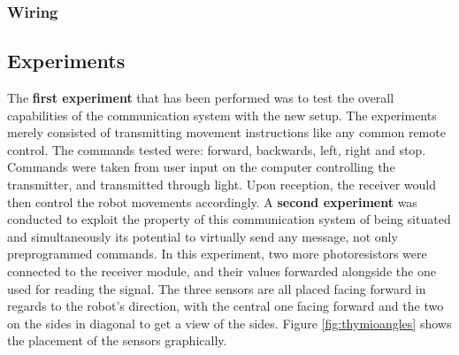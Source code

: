 \subsubsection{Wiring}

\subsection{Experiments}
The \textbf{first experiment} that has been performed was to test the overall capabilities of the communication system with the new setup.
The experiments merely consisted of transmitting movement instructions like any common remote control.
The commands tested were: forward, backwards, left, right and stop.
Commands were taken from user input on the computer controlling the transmitter, and transmitted through light.
Upon reception, the receiver would then control the robot movements accordingly.
\newline
A \textbf{second experiment} was conducted to exploit the property of this communication system of being situated and simultaneously its potential to virtually send any message, not only preprogrammed commands.
In this experiment, two more photoresistors were connected to the receiver module, and their values forwarded alongside the one used for reading the signal.
The three sensors are all placed facing forward in regards to the robot's direction, with the central one facing forward and the two on the sides in diagonal to get a view of the sides.
Figure \ref{fig:thymioangles} shows the placement of the sensors graphically.

